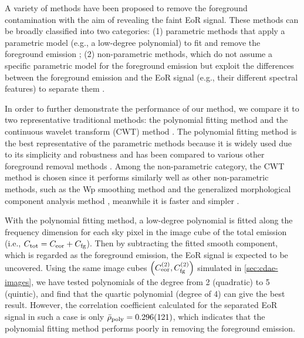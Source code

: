 A variety of methods have been proposed to remove the foreground
contamination with the aim of revealing the faint EoR signal.
These methods can be broadly classified into two categories:
(1) parametric methods that apply a parametric model (e.g., a low-degree
polynomial) to fit and remove the foreground emission
\cite{wang2006,jelic2008,liu2009fgrm,wang2013,bonaldi2015};
(2) non-parametric methods, which do not assume a specific parametric model
for the foreground emission but exploit the differences between the
foreground emission and the EoR signal (e.g., their different spectral
features) to separate them
\cite{harker2009,chapman2012,chapman2013,gu2013,mertens2018}.

In order to further demonstrate the performance of our method, we compare
it to two representative traditional methods:
the polynomial fitting method \cite{wang2006} and
the continuous wavelet transform (CWT) method \cite{gu2013}.
The polynomial fitting method is the best representative of the parametric
methods because it is widely used due to its simplicity and robustness
\cite{jelic2008,liu2009ps,pritchard2010}
and has been compared to various other foreground removal methods
\cite{harker2009,alonso2015,chapman2015}.
Among the non-parametric category, the CWT method is chosen since it
performs similarly well as other non-parametric methods, such as the
Wp smoothing method \cite{harker2009} and the generalized morphological
component analysis method \cite{chapman2013},
meanwhile it is faster and simpler \cite{gu2013,chapman2015}.

With the polynomial fitting method,
a low-degree polynomial is fitted along the frequency dimension for each
sky pixel in the image cube of the total emission (i.e.,
$C_{\mathrm{tot}} = C_{\mathrm{eor}} + C_{\mathrm{fg}}$).
Then by subtracting the fitted smooth component, which is regarded as
the foreground emission, the EoR signal is expected to be uncovered.
Using the same image cubes
$\left( C_{\mathrm{eor}}^{(2)}, C_{\mathrm{fg}}^{(2)} \right)$
simulated in \autoref{sec:cdae-images},
we have tested polynomials of the degree from 2 (quadratic) to
5 (quintic), and find that the quartic polynomial (degree of 4)
can give the best result.
However, the correlation coefficient calculated for the separated EoR
signal in such a case is only
$\bar{\rho}_{\mathrm{poly}} = \num{0.296 +- 0.121}$,
which indicates that the polynomial fitting method performs poorly in
removing the foreground emission.

